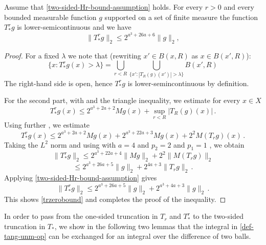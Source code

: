 \begin{lemma}\label{simple-nontangential-operator}
\leanok
{}
Assume that \eqref{two-sided-Hr-bound-assumption} holds.
For every $r>0$ and every bounded measurable function $g$ supported on a set of finite measure
the function $T_{*}^r g$ is lower-semicontinuous and we have
\begin{equation}\label{trzerobound}
    \|T_{*}^rg\|_2\le 2^{a^3+26a+6}\|g\|_2,
\end{equation}
\end{lemma}
\begin{proof}
\leanok
For a fixed $\lambda$ we note that (rewriting $x'\in B(x,R)$ as $x\in B(x',R)$):
\begin{equation}
    \{x : T_{*}^r g(x) > \lambda\} = \bigcup_{r<R}\bigcup_{\{x':|T_R(g)(x')|>\lambda\}} B(x',R)
\end{equation}
The right-hand side is open, hence $T_{*}^r g$ is lower-semincontinuous by definition.

For the second part, with  and the triangle inequality, we estimate for every $x\in X$
\begin{equation}
     T_{*}^r g(x)
     \le 2^{a^3 + 2a + 2} Mg(x)+\sup_{r<R} |T_R(g)(x)|\, .
\end{equation}
Using further , we estimate
\begin{equation}
      T_{*}^r g(x)
     \le 2^{a^3+2a+2}Mg(x) + 2^{a^3+22a+3}Mg(x) + 2^{2}M(T_rg)(x)\, .
\end{equation}
Taking the $L^2$ norm and using  with $a=4$  and $p_2=2$ and $p_1=1$ , we obtain
\begin{equation}
      \|T_{*}^r g\|_2
     \le 2^{a^3+22a+4} \|Mg\|_2 + 2^{2}\|M(T_rg)\|_2
\end{equation}
\begin{equation}
     \le 2^{a^3+26a+5} \|g\|_2 + 2^{4a+3}\|T_r g\|_2\, .
\end{equation}
Applying \eqref{two-sided-Hr-bound-assumption} gives
\begin{equation}
      \|T_{*}^r g\|_2\le 2^{a^3+26a+5}\|g\|_2 + 2^{a^3+4a+3}\|g\|_2\, .
\end{equation}
This shows \eqref{trzerobound} and completes the proof of the inequality.
\end{proof}
In order to pass from the one-sided truncation in $T_r$ and $T_{*}^r$ to the two-sided truncation in $T_*$, we show in the following two lemmas that the integral in \eqref{def-tang-unm-op} can be exchanged for an integral over the difference of two balls.
